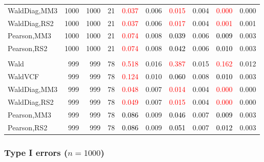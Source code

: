 \documentclass[
]{article}
\begin{document}
\begin{table}[H]
{\begin{tabular}[t]{lrrrrrrlrr}
\hspace{1em}WaldDiag,MM3 & 1000 & 1000 & 21 & \textcolor{red}{0.037} & 0.006 & \textcolor{red}{0.015} & 0.004 & \textcolor{red}{0.000} & 0.000\\
\hspace{1em}WaldDiag,RS2 & 1000 & 1000 & 21 & \textcolor{red}{0.037} & 0.006 & \textcolor{red}{0.017} & 0.004 & \textcolor{red}{0.001} & 0.001\\
\hspace{1em}Pearson,MM3 & 1000 & 1000 & 21 & \textcolor{red}{0.074} & 0.008 & \textcolor{black}{0.039} & 0.006 & \textcolor{black}{0.009} & 0.003\\
\hspace{1em}Pearson,RS2 & 1000 & 1000 & 21 & \textcolor{red}{0.074} & 0.008 & \textcolor{black}{0.042} & 0.006 & \textcolor{black}{0.010} & 0.003\\
\addlinespace[0.3em]
\multicolumn{10}{l}{\textbf{3F 15V}}\\
\hspace{1em}Wald & 999 & 999 & 78 & \textcolor{red}{0.518} & 0.016 & \textcolor{red}{0.387} & 0.015 & \textcolor{red}{0.162} & 0.012\\
\hspace{1em}WaldVCF & 999 & 999 & 78 & \textcolor{red}{0.124} & 0.010 & \textcolor{black}{0.060} & 0.008 & \textcolor{black}{0.010} & 0.003\\
\hspace{1em}WaldDiag,MM3 & 999 & 999 & 78 & \textcolor{red}{0.048} & 0.007 & \textcolor{red}{0.014} & 0.004 & \textcolor{red}{0.000} & 0.000\\
\hspace{1em}WaldDiag,RS2 & 999 & 999 & 78 & \textcolor{red}{0.049} & 0.007 & \textcolor{red}{0.015} & 0.004 & \textcolor{red}{0.000} & 0.000\\
\hspace{1em}Pearson,MM3 & 999 & 999 & 78 & \textcolor{black}{0.086} & 0.009 & \textcolor{black}{0.046} & 0.007 & \textcolor{black}{0.009} & 0.003\\
\hspace{1em}Pearson,RS2 & 999 & 999 & 78 & \textcolor{black}{0.086} & 0.009 & \textcolor{black}{0.051} & 0.007 & \textcolor{black}{0.012} & 0.003\\
\bottomrule
\end{tabular}}
\endgroup{}
\end{table}

\hypertarget{type-i-errors-n1000-2}{%
\subsubsection{\texorpdfstring{Type I errors
(\(n=1000\))}{Type I errors (n=1000)}}\label{type-i-errors-n1000-2}}
\end{document}
